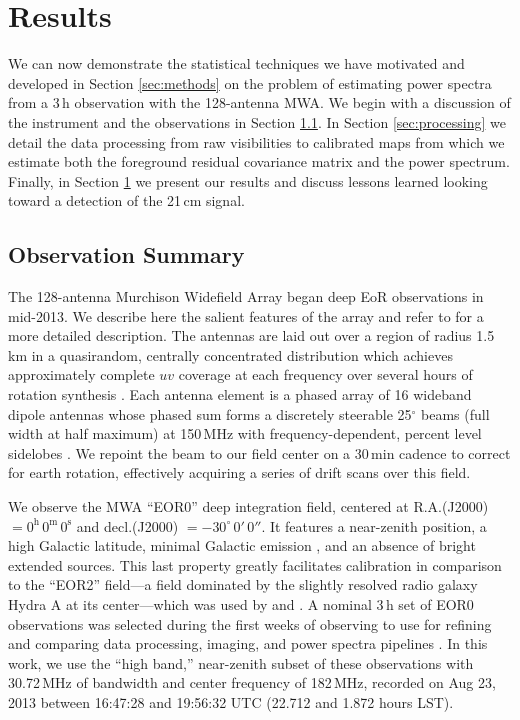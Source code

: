 
\section{Results} \label{sec:results}

We can now demonstrate the statistical techniques we have motivated and developed in Section \ref{sec:methods} on the problem of estimating power spectra from a 3\,h observation with the 128-antenna MWA. We begin with a discussion of the instrument and the observations in Section \ref{sec:observation}. In Section \ref{sec:processing} we detail the data processing from raw visibilities to calibrated maps from which we estimate both the foreground residual covariance matrix and the power spectrum. Finally, in Section \ref{sec:results} we present our results and discuss lessons learned looking toward a detection of the 21\,cm signal.


\subsection{Observation Summary} \label{sec:observation}

The 128-antenna Murchison Widefield Array began deep EoR observations in mid-2013. We describe here the salient features of the array and refer to \citet{tingay13} for a more detailed description. The antennas are laid out over a region of radius 1.5\,km in a quasirandom, centrally concentrated distribution which achieves approximately complete $uv$ coverage at each frequency over several hours of rotation synthesis \citep{beardsley13}. Each antenna element is a phased array of 16 wideband dipole antennas whose phased sum forms a discretely steerable 25$^\circ$ beams (full width at half maximum) at 150\,MHz with frequency-dependent, percent level sidelobes \citep{neben15}. We repoint the beam to our field center on a 30\,min cadence to correct for earth rotation, effectively acquiring a series of drift scans over this field. 

We observe the MWA ``EOR0'' deep integration field, centered at R.A.(J2000) $= 0^\text{h}\,0^\text{m}\,0^\text{s}$ and decl.(J2000) $= -30^\circ\,0'\,0''$. It features a near-zenith position, a high Galactic latitude, minimal Galactic emission \citep{gsm}, and an absence of bright extended sources. This last property greatly facilitates calibration in comparison to the ``EOR2'' field---a field dominated by the slightly resolved radio galaxy Hydra A at its center---which was used by \citet{williamsimaging} and \citet{X13}. A nominal 3\,h set of EOR0 observations was selected during the first weeks of observing to use for refining and comparing data processing, imaging, and power spectra pipelines \citep{JacobsPipelines}. In this work, we use the ``high band,'' near-zenith subset of these observations with 30.72\,MHz of bandwidth and center frequency of 182\,MHz, recorded on Aug 23, 2013 between 16:47:28 and 19:56:32 UTC (22.712 and 1.872 hours LST). 

